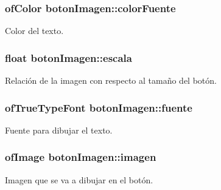 \subsubsection[{color\+Fuente}]{\setlength{\rightskip}{0pt plus 5cm}of\+Color boton\+Imagen\+::color\+Fuente\hspace{0.3cm}{\ttfamily [protected]}}\label{classboton_imagen_ab2d8d1388ec4d76dbcd5e9a61436742c}


Color del texto. 

\hypertarget{classboton_imagen_a38d03166cf4cc63b616626875fdd817d}{}
\subsubsection[{escala}]{\setlength{\rightskip}{0pt plus 5cm}float boton\+Imagen\+::escala\hspace{0.3cm}{\ttfamily [protected]}}\label{classboton_imagen_a38d03166cf4cc63b616626875fdd817d}


Relación de la imagen con respecto al tamaño del botón. 

\hypertarget{classboton_imagen_a7f0f528e711fd891d186b3bfee192e39}{}
\subsubsection[{fuente}]{\setlength{\rightskip}{0pt plus 5cm}of\+True\+Type\+Font boton\+Imagen\+::fuente\hspace{0.3cm}{\ttfamily [protected]}}\label{classboton_imagen_a7f0f528e711fd891d186b3bfee192e39}


Fuente para dibujar el texto. 

\hypertarget{classboton_imagen_a5099abcbecf2cc9d6cdb8cbe5b3a6921}{}
\subsubsection[{imagen}]{\setlength{\rightskip}{0pt plus 5cm}of\+Image boton\+Imagen\+::imagen\hspace{0.3cm}{\ttfamily [protected]}}\label{classboton_imagen_a5099abcbecf2cc9d6cdb8cbe5b3a6921}


Imagen que se va a dibujar en el botón. 

\hypertarget{classboton_imagen_a7118e57f1d4c1d91f2142b908f109f89}{}
